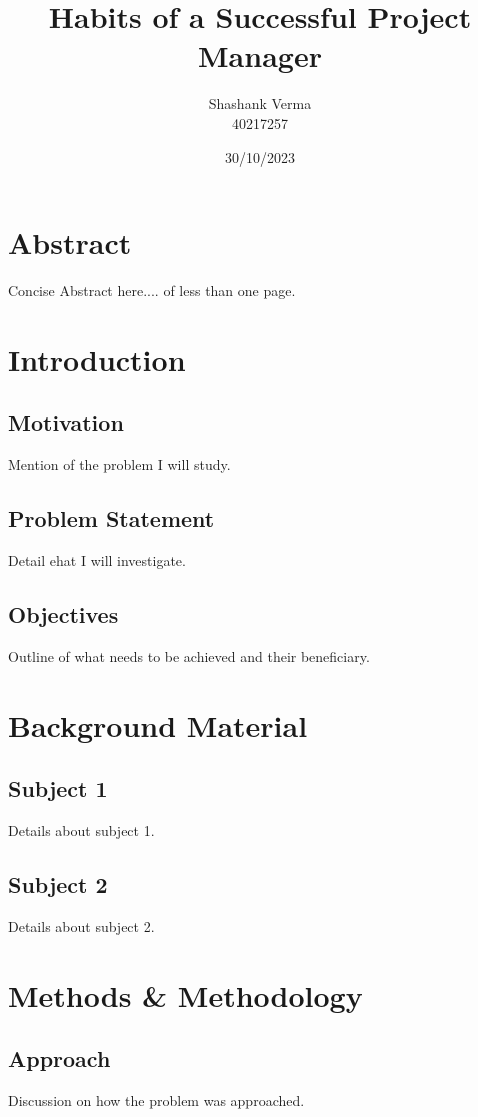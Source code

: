\documentclass{article}
\title{Habits of a Successful Project Manager}
\author{Shashank Verma \\ 40217257}
\date{30/10/2023}
\begin{document}
\maketitle
{}

\newpage
\tableofcontents
\newpage
{}

\section{Abstract}
Concise Abstract here.... of less than one page.

\section{Introduction}
\subsection{Motivation}
Mention of the problem I will study.

\subsection{Problem Statement}
Detail ehat I will investigate.

\subsection{Objectives}
Outline of what needs to be achieved and their beneficiary.

\section{Background Material}
\subsection{Subject 1}
Details about subject 1.

\subsection{Subject 2}
Details about subject 2.


\section{Methods \& Methodology}
\subsection{Approach}
Discussion on how the problem was approached.
\end{document}
